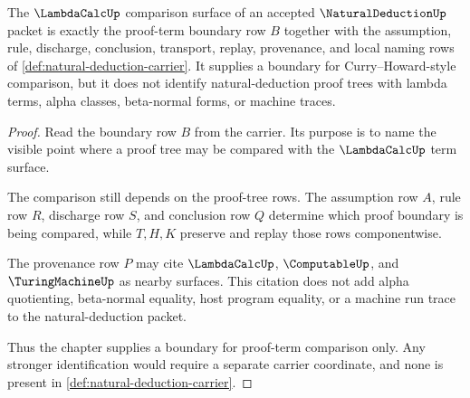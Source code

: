 \begin{theorem}
\label{thm:natural-deduction-lambdacalc-proof-term-boundary}
The $\LambdaCalcUp$ comparison surface of an accepted $\NaturalDeductionUp$ packet is exactly the proof-term boundary row $B$ together with the assumption, rule, discharge, conclusion, transport, replay, provenance, and local naming rows of \autoref{def:natural-deduction-carrier}. It supplies a boundary for Curry--Howard-style comparison, but it does not identify natural-deduction proof trees with lambda terms, alpha classes, beta-normal forms, or machine traces.
\end{theorem}
\begin{proof}
Read the boundary row $B$ from the carrier. Its purpose is to name the visible point where a proof tree may be compared with the $\LambdaCalcUp$ term surface.

The comparison still depends on the proof-tree rows. The assumption row $A$, rule row $R$, discharge row $S$, and conclusion row $Q$ determine which proof boundary is being compared, while $T,H,K$ preserve and replay those rows componentwise.

The provenance row $P$ may cite $\LambdaCalcUp$, $\ComputableUp$, and $\TuringMachineUp$ as nearby surfaces. This citation does not add alpha quotienting, beta-normal equality, host program equality, or a machine run trace to the natural-deduction packet.

Thus the chapter supplies a boundary for proof-term comparison only. Any stronger identification would require a separate carrier coordinate, and none is present in \autoref{def:natural-deduction-carrier}.
\end{proof}



